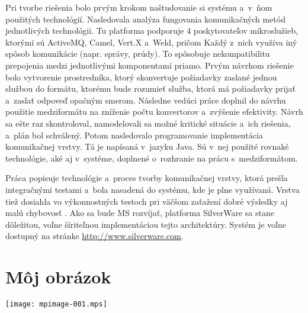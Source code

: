 \documentclass[a4paper]{article}
\begin{document}
Pri tvorbe riešenia bolo prvým krokom naštudovanie si systému a~v~ňom použitých technológií. Nasledovala analýza fungovania komunikačných metód jednotlivých technológii. Tu platforma podporuje 4 poskytovateľov mikroslužieb, ktorými sú ActiveMQ, Camel, Vert.X a~Weld, pričom Každý z~nich využíva iný spôsob komunikácie (napr. správy, prúdy). To spôsobuje nekompatibilitu prepojenia medzi jednotlivými komponentami priamo. Prvým návrhom riešenie bolo vytvorenie prostredníka, ktorý skonvertuje požiadavky zaslané jednou službou do formátu, ktorému bude rozumieť služba, ktorá má požiadavky prijať a~zaslať odpoveď opačným smerom. Následne vedúci práce doplnil do návrhu použitie medziformátu na zníženie počtu konvertorov a~zvýšenie efektivity. Návrh sa ešte raz skontroloval, namodelovali sa možné kritické situácie a~ich riešenia, a~plán bol schválený. Potom nasledovalo programovanie  implementácia komunikačnej vrstvy. Tá je napísaná v~jazyku Java. Sú v~nej použité rovnaké technológie, aké aj v~systéme, doplnené o~rozhranie na prácu s~medziformátom.

Práca popisuje technológie a~proces tvorby komunikačnej vrstvy, ktorá prešla integračnými testami a~bola nasadená do systému, kde je plne využívaná. Vrstva tiež dosiahla vo výkonnostných testoch pri väčšom zaťažení dobré výsledky aj malú chybovosť .  Ako sa bude MS rozvíjať, platforma SilverWare sa stane dôležitou, voľne šíriteľnou implementáciou tejto architektúry. Systém je voľne dostupný na stránke \url{http://www.silverware.com}.

\printindex

\setcounter{biburllcpenalty}{7000}
\setcounter{biburlucpenalty}{8000}

\printbibliography

\section*{Môj obrázok}
\texttt{[image: mpimage-001.mps]}
\end{document}
